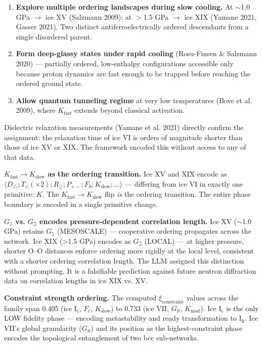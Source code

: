 \documentclass[12pt,a4paper]{article}
\begin{document}
\begin{enumerate}
    \item \textbf{Explore multiple ordering landscapes during slow cooling.} At $\sim$1.0 GPa $\to$ ice XV (Salzmann 2009); at $>$1.5 GPa $\to$ ice XIX (Yamane 2021, Gasser 2021). Two distinct antiferroelectrically ordered descendants from a single disordered parent.
    \item \textbf{Form deep-glassy states under rapid cooling} (Rosu-Finsen \& Salzmann 2020) --- partially ordered, low-enthalpy configurations accessible only because proton dynamics are fast enough to be trapped before reaching the ordered ground state.
    \item \textbf{Allow quantum tunneling regime} at very low temperatures (Bove et al. 2009), where $K_{\text{fast}}$ extends beyond classical activation.
\end{enumerate}

Dielectric relaxation measurements (Yamane et al. 2021) directly confirm the assignment: the relaxation time of ice VI is orders of magnitude shorter than those of ice XV or XIX. The framework encoded this without access to any of that data.

\textbf{$K_{\text{fast}} \to K_{\text{slow}}$ as the ordering transition.} Ice XV and XIX encode as $\langle D_\triangle; T_{\in}(\times 2); R_\supseteq; P_{+-}; F_\eth; K_{\text{slow}}; \ldots \rangle$ --- differing from ice VI in exactly one primitive: $K$. The $K_{\text{fast}} \to K_{\text{slow}}$ flip \emph{is} the ordering transition. The entire phase boundary is encoded in a single primitive change.

\textbf{$G_{\gimel}$ vs. $G_{\beth}$ encodes pressure-dependent correlation length.} Ice XV ($\sim$1.0 GPa) retains $G_{\gimel}$ (MESOSCALE) --- cooperative ordering propagates across the network. Ice XIX (\textgreater{}1.5 GPa) encodes as $G_{\beth}$ (LOCAL) --- at higher pressure, shorter O--O distances enforce ordering more rigidly at the local level, consistent with a shorter ordering correlation length. The LLM assigned this distinction without prompting. It is a falsifiable prediction against future neutron diffraction data on correlation lengths in ice XIX vs. XV.

\textbf{Constraint strength ordering.} The computed $\xi_{\text{constraint}}$ values across the family span 0.405 (ice I$_\text{c}$, $F_\ell$, $K_{\text{slow}}$) to 0.733 (ice VII, $G_{\aleph}$, $K_{\text{mod}}$). Ice I$_\text{c}$ is the only LOW fidelity phase --- encoding metastability and ready transformation to I$_\text{h}$. Ice VII's global granularity ($G_{\aleph}$) and its position as the highest-constraint phase encodes the topological entanglement of two bcc sub-networks.
\end{document}
